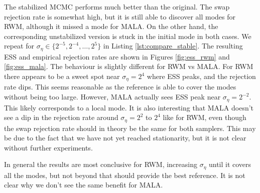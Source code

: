 \documentclass{article}
\begin{document}
The stabilized MCMC performs much better than the original. The swap rejection
rate is somewhat high, but it is still able to discover all modes for RWM,
although it missed a mode for MALA. On the other hand,
the corresponding unstabilized version is stuck in the initial mode in both cases.
We repeat for $\sigma_\eta \in \{2^{-5}, 2^{-4}, \ldots, 2^5\}$ in Listing
\ref{lst:compare_stable}. The resulting ESS and empirical rejection rates are
shown in Figures \ref{fig:ess_rwm} and \ref{fig:ess_mala}. The behaviour is
slightly different for RWM vs MALA. For RWM there appears to be a sweet spot near
$\sigma_\eta = 2^4$ where ESS peaks, and the rejection rate dips. This seems
reasonable as the reference is able to cover the modes without being too large.
However, MALA actually sees ESS peak near $\sigma_\eta = 2^{-2}$. This likely
corresponds to a local mode. It is also interesting that MALA doesn't see a
dip in the rejection rate around $\sigma_\eta = 2^2$ to $2^4$ like for RWM, even
though the swap rejection rate should in theory be the same for both samplers.
This may be due to the fact that we have not yet reached stationarity, but
it is not clear without further experiments.

In general the results are most conclusive for RWM, increasing $\sigma_\eta$
until it covers all the modes, but not beyond that should provide the best
reference. It is not clear why we don't  see the same benefit for MALA.

\end{document}
